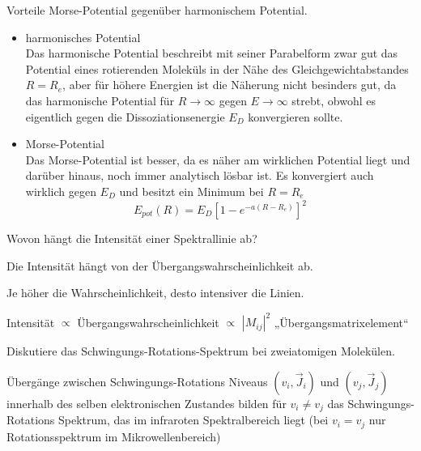 \documentclass[a5paper,12pt,ngerman,print,grid=front]{kartei}
\begin{document}
	\begin{karte}{
		Vorteile Morse-Potential gegenüber harmonischem Potential.
		}
		
		\begin{itemize}
			\item harmonisches Potential \\
				Das harmonische Potential beschreibt mit seiner Parabelform zwar gut das Potential eines rotierenden Moleküls in der Nähe des Gleichgewichtabstandes $R=R_e$, aber für höhere Energien ist die Näherung nicht besinders gut, da das harmonische Potential für $R \rightarrow \infty$ gegen $ E \rightarrow \infty $ strebt, obwohl es eigentlich gegen die Dissoziationsenergie $E_D$ konvergieren sollte.
				
			\item Morse-Potential \\
				Das Morse-Potential ist besser, da es näher am wirklichen Potential liegt und darüber hinaus, noch immer analytisch lösbar ist. Es konvergiert auch wirklich gegen $E_D$ und besitzt ein Minimum bei $R=R_e$
				$$ E_{pot}(R) = E_D[ 1-e^{ -a( R-R_e ) } ]^2 $$
				
		\end{itemize}
		
	\end{karte}


	\begin{karte}{
		Wovon hängt die Intensität einer Spektrallinie ab?
		}
		
		Die Intensität hängt von der Übergangswahrscheinlichkeit ab.
		
		Je höher die Wahrscheinlichkeit, desto intensiver die Linien.
		
		Intensität $\propto$ Übergangswahrscheinlichkeit $\propto$ $|M_{ij}|^2$ „Übergangsmatrixelement“
		
	\end{karte}


	\begin{karte}{
		Diskutiere das Schwingungs-Rotations-Spektrum bei zweiatomigen Molekülen.
		}
		
		Übergänge zwischen Schwingungs-Rotations Niveaus $ (v_i, \vec{J}_i ) $ und $ (v_j, \vec{J}_j ) $ innerhalb des selben elektronischen Zustandes bilden für $ v_i \neq v_j $ das Schwingungs-Rotations Spektrum, das im infraroten Spektralbereich liegt (bei $ v_i = v_j $ nur Rotationsspektrum im Mikrowellenbereich)
		
	\end{karte}
\end{document}
